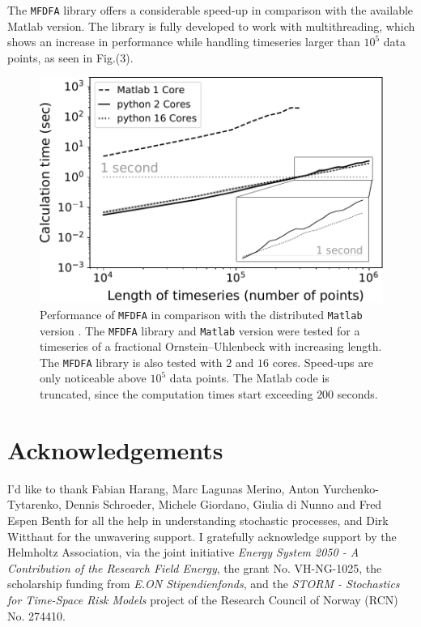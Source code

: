 \documentclass[pre, a4paper, aps, floatfix, superscriptaddress, onecolumn, notitlepage, longbibliography]{revtex4-1} %
\begin{document}
The \texttt{MFDFA} library offers a considerable speed-up in comparison with the available Matlab version.
The library is fully developed to work with multithreading, which shows an increase in performance while handling timeseries larger than $10^5$ data points, as seen in Fig.(3).

\begin{figure}[h]
  \includegraphics[width = 0.5\linewidth]{fig3.pdf}
  \caption{Performance of \texttt{MFDFA} in comparison with the distributed \texttt{Matlab} version \cite{Ihlen2012}.
  The \texttt{MFDFA} library and \texttt{Matlab} version were tested for a timeseries of a fractional Ornstein--Uhlenbeck with increasing length.
  The \texttt{MFDFA} library is also tested with $2$ and $16$ cores.
  Speed-ups are only noticeable above $10^5$ data points.
  The Matlab code is truncated, since the computation times start exceeding $200$ seconds.}
\end{figure}


\section*{Acknowledgements}
I'd like to thank Fabian Harang, Marc Lagunas Merino, Anton Yurchenko-Tytarenko, Dennis Schroeder, Michele Giordano, Giulia di Nunno and Fred Espen Benth for all the help in understanding stochastic processes, and Dirk Witthaut for the unwavering support.
I gratefully acknowledge support by the Helmholtz Association, via the joint initiative \textit{Energy System 2050 - A Contribution of the Research Field Energy}, the grant No. VH-NG-1025, the scholarship funding from \textit{E.ON Stipendienfonds}, and the \textit{STORM - Stochastics for Time-Space Risk Models} project of the Research Council of Norway (RCN) No. 274410.


\end{document}
